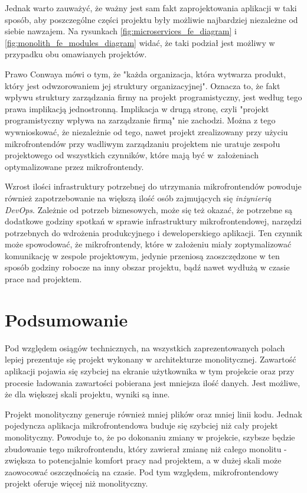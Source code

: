 \documentclass{SGGW-thesis}
\begin{document}
{  Jednak warto zauważyć, że ważny jest sam fakt zaprojektowania aplikacji w taki sposób, aby poszczególne części projektu były możliwie najbardziej niezależne od siebie nawzajem. Na rysunkach \cref{fig:microservices_fe_diagram} i \cref{fig:monolith_fe_modules_diagram} widać, że taki podział jest możliwy w przypadku obu omawianych projektów.

  Prawo Conwaya \cite{conway} mówi o tym, że "każda organizacja, która wytwarza produkt, który jest odwzorowaniem jej struktury organizacyjnej". Oznacza to, że fakt wpływu struktury zarządzania firmy na projekt programistyczny, jest według tego prawa implikacją jednostronną. Implikacja w drugą stronę, czyli "projekt programistyczny wpływa na zarządzanie firmą" nie zachodzi. Można z tego wywnioskować, że niezależnie od tego, nawet projekt zrealizowany przy użyciu mikrofrontendów przy wadliwym zarządzaniu projektem nie uratuje zespołu projektowego od wszystkich czynników, które mają być w~założeniach optymalizowane przez mikrofrontendy.

  Wzrost ilości infrastruktury potrzebnej do utrzymania mikrofrontendów powoduje również zapotrzebowanie na większą ilość osób zajmujących się \textit{inżynierią DevOps}. Zależnie od potrzeb biznesowych, może się też okazać, że potrzebne są dodatkowe godziny spotkań w sprawie infrastruktury mikrofrontendowej, narzędzi potrzebnych do wdrożenia produkcyjnego i deweloperskiego aplikacji. Ten czynnik może spowodować, że mikrofrontendy, które w założeniu miały zoptymalizować komunikację w zespole projektowym, jedynie przeniosą zaoszczędzone w ten sposób godziny robocze na inny obszar projektu, bądź nawet wydłużą w czasie prace nad projektem.

\chapter{Podsumowanie}
Pod względem osiągów technicznych, na wszystkich zaprezentowanych polach lepiej prezentuje się projekt wykonany w architekturze monolitycznej. Zawartość aplikacji pojawia się szybciej na ekranie użytkownika w tym projekcie oraz przy procesie ładowania zawartości pobierana jest mniejsza ilość danych. Jest możliwe, że dla większej skali projektu, wyniki są inne.

Projekt monolityczny generuje również mniej plików oraz mniej linii kodu. Jednak pojedyncza aplikacja mikrofrontendowa buduje się szybciej niż cały projekt monolityczny. Powoduje to, że po dokonaniu zmiany w projekcie, szybsze będzie zbudowanie tego mikrofrontendu, który zawierał zmianę niż całego monolitu - zwiększa to potencjalnie komfort pracy nad projektem, a w dużej skali może zaowocować oszczędnością na czasie. Pod tym względem, mikrofrontendowy projekt oferuje więcej niż monolityczny.

}
\end{document}
